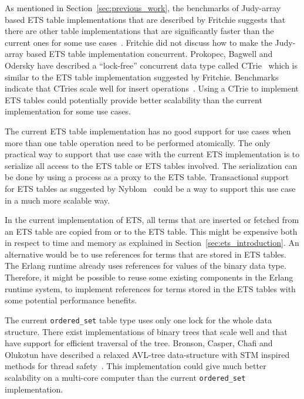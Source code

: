 \documentclass[aps,pre,preprint,nofootinbib]{revtex4}
\begin{document}
As mentioned in Section~\ref{sec:previous_work}, the benchmarks of Judy-array based ETS table implementations that are described by Fritchie suggests that there are other table implementations that are significantly faster than the current ones for some use cases~\cite{ScottEtsJudy}.
Fritchie did not discuss how to make the Judy-array based ETS table implementation concurrent.
Prokopec, Bagwell and Odersky have described a ``lock-free'' concurrent data type called CTrie~\cite{ProkopecCTrie} which is similar to the ETS table implementation suggested by Fritchie.
Benchmarks indicate that CTries scale well for insert operations~\cite{ProkopecCTrie}.
Using a CTrie to implement ETS tables could potentially provide better scalability than the current implementation for some use cases.

The current ETS table implementation has no good support for use cases when more than one table operation need to be performed atomically.
The only practical way to support that use case with the current ETS implementation is to serialize all access to the ETS table or ETS tables involved.
The serialization can be done by using a process as a proxy to the ETS table.
Transactional support for ETS tables as suggested by Nyblom~\cite{PatrikErlangTrans} could be a way to support this use case in a much more scalable way.

In the current implementation of ETS, all terms that are inserted or fetched from an ETS table are copied from or to the ETS table.
This might be expensive both in respect to time and memory as explained in Section~\ref{sec:ets_introduction}.
An alternative would be to use references for terms that are stored in ETS tables.
The Erlang runtime already uses references for values of the binary data type.
Therefore, it might be possible to reuse some existing components in the Erlang runtime system, to implement references for terms stored in the ETS tables with some potential performance benefits.


The current \verb|ordered_set| table type uses only one lock for the whole data structure.
There exist implementations of binary trees that scale well and that have support for efficient traversal of the tree.
Bronson, Casper, Chafi and Olukotun have described a relaxed AVL-tree data-structure with STM inspired methods for thread safety~\cite{BronsonPracTree}.
This implementation could give much better scalability on a multi-core computer than the current \verb|ordered_set| implementation.
\end{document}
